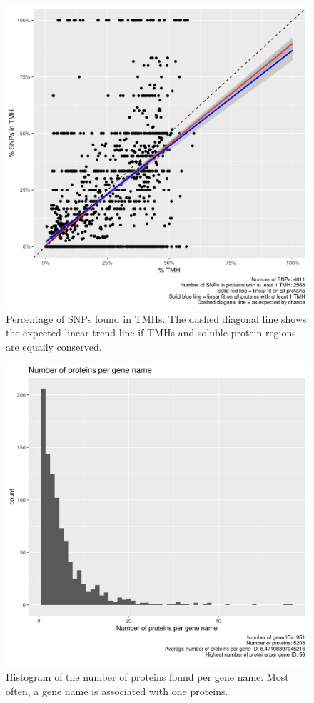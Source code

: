 \begin{figure}[!htbp]
  \includegraphics[width=\textwidth]{ncbi_peregrine_results/fig_f_snps_found_and_expected.png}
  \caption{
    Percentage of SNPs found in TMHs.
    The dashed diagonal line shows the expected linear trend line
    if TMHs and soluble protein regions are equally conserved.
  }
  \label{fig:f_snps_found_and_expected}
\end{figure}

\begin{figure}[!htbp]
  \includegraphics[width=\textwidth]{ncbi_peregrine_results/fig_n_proteins_per_gene_name.png}
  \caption{
    Histogram of the number of proteins found per gene name.
    Most often, a gene name is associated with one proteins. 
  }
  \label{fig:n_proteins_per_gene_name}
\end{figure}


